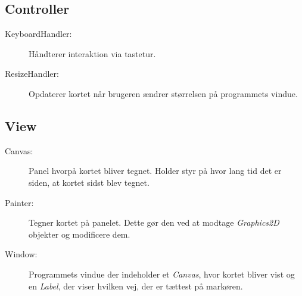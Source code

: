\subsection{Controller}

\begin{description}
	\item[KeyboardHandler:] Håndterer interaktion via tastetur.
	\item[ResizeHandler:] Opdaterer kortet når brugeren ændrer størrelsen på programmets vindue.
\end{description}

\subsection{View}

\begin{description}
	\item[Canvas:] Panel hvorpå kortet bliver tegnet. Holder styr på hvor lang tid det er siden, at kortet sidst blev tegnet.
	\item[Painter:] Tegner kortet på panelet. Dette gør den ved at modtage \emph{Graphics2D} objekter og modificere dem.
	\item[Window:] Programmets vindue der indeholder et \emph{Canvas}, hvor kortet bliver vist og en \emph{Label}, der viser hvilken vej, der er tættest på markøren.
\end{description}